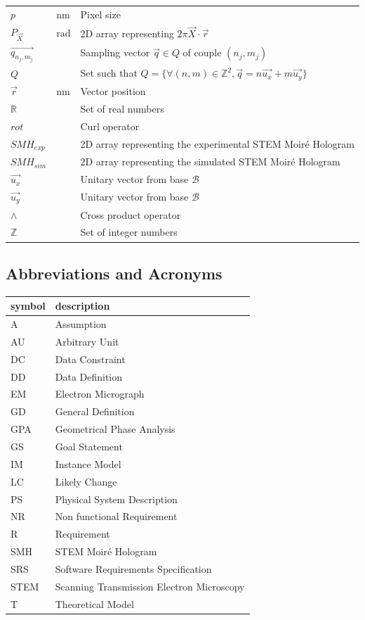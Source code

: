 \documentclass[12pt]{article}
\begin{document}
\begin{longtable*}{l l p{12cm}}
$p$ & \si{\nano\meter} & Pixel size\\
$P_{\overrightarrow{X}}$ & rad & 2D array representing $2\pi\overrightarrow{X}\cdot\vec{r}$\\
$\overrightarrow{q_{n_j,m_j}}$ & & Sampling vector $\vec{q} \in Q$ of couple $(n_j,m_j)$\\
$Q$ & & Set such that $Q=\{\forall (n,m) \in \mathbb{Z}^{2}, \vec{q}=n\vec{u_x}+m\vec{u_y}\}$ \\
$\vec{r}$ & \si{\nano\meter} & Vector position \\
$\mathbb{R}$ & & Set of real numbers \\
$rot$ & & Curl operator\\
$SMH_{exp}$ & & 2D array representing the experimental STEM Moir{\'e} Hologram \\
$SMH_{sim}$ & & 2D array representing the simulated STEM Moir{\'e} Hologram \\
$\vec{u_x}$ & & Unitary vector from base $\mathcal{B}$ \\
$\vec{u_y}$ & & Unitary vector from base $\mathcal{B}$ \\
$\wedge$ & & Cross product operator\\
$\mathbb{Z}$ & & Set of integer numbers\\
\bottomrule
\end{longtable*}

\subsection{Abbreviations and Acronyms}

\renewcommand{\arraystretch}{1.2}
\begin{tabular}{l l} 
  \toprule		
  \textbf{symbol} & \textbf{description}\\
  \midrule 
  A & Assumption\\
  AU & Arbitrary Unit\\
  DC & Data Constraint \\
  DD & Data Definition\\
  EM & Electron Micrograph \\
  GD & General Definition\\
  GPA & Geometrical Phase Analysis \\
  GS & Goal Statement\\
  IM & Instance Model\\
  LC & Likely Change\\
  PS & Physical System Description\\
  NR & Non functional Requirement\\
  R & Requirement\\
  SMH & STEM Moir{\'e} Hologram \\
  SRS & Software Requirements Specification\\
  STEM & Scanning Transmission Electron Microscopy \\
  T & Theoretical Model\\
  \bottomrule
\end{tabular}\\
\end{document}
